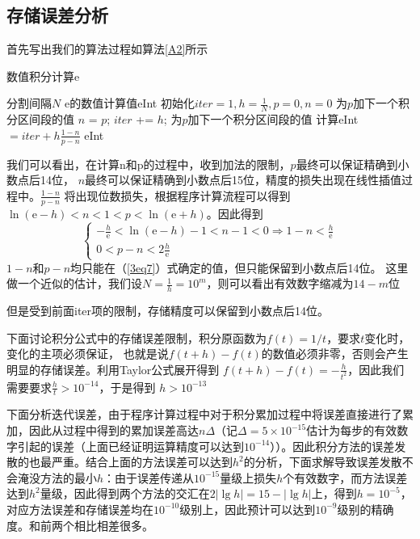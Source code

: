 \documentclass[onecolumn,compsoc]{IEEEtran}
\renewcommand{\|}{\Bigg |}
\newcommand{\e}{\mathrm{e}}
\begin{document}
\subsection{存储误差分析}
首先写出我们的算法过程如算法\ref{A2}所示
\begin{algorithm}[h]\caption{数值积分计算e}\label{A2}
\begin{algorithmic}
\Require 分割间隔$N$
\Ensure e的数值计算值eInt
\State 初始化$iter = 1, h = \frac{1}{N}, p = 0, n = 0$
\State 为$p$加下一个积分区间段的值
\State $n$ = $p$;
\State $iter$ += $h$;
\State 为$p$加下一个积分区间段的值
\EndWhile
\State 计算eInt$ = iter + h\frac{1 - n}{p - n}$
\State \Return eInt
\end{algorithmic}\end{algorithm}
我们可以看出，在计算n和p的过程中，收到加法的限制，$p$最终可以保证精确到小数点后14位，
$n$最终可以保证精确到小数点后15位，精度的损失出现在线性插值过程中。$\frac{1 - n}{p - n}$
将出现位数损失，根据程序计算流程可以得到$\ln(\e-h) < n < 1 < p < \ln(\e+h)$。因此得到
\begin{equation}\label{3eq7}\begin{cases}
-\frac{h}{\e} < \ln(\e-h) -1 < n -1 < 0 \Rightarrow 1-n < \frac{h}{\e} \\
0 < p-n < 2\frac{h}{\e}
\end{cases}\end{equation}
$1-n$和$p-n$均只能在（\ref{3eq7}）式确定的值，但只能保留到小数点后14位。
这里做一个近似的估计，我们设$N = \frac{1}{h} = 10^m$，则可以看出有效数字缩减为$14 - m$位

但是受到前面iter项的限制，存储精度可以保留到小数点后14位。

下面讨论积分公式中的存储误差限制，积分原函数为$f(t) = 1/t$，要求$t$变化时，变化的主项必须保证，
也就是说$f(t+h) - f(t)$的数值必须非零，否则会产生明显的存储误差。利用Taylor公式展开得到
$f(t+h) - f(t) = -\frac{h}{t^2}$，因此我们需要要求$\frac{h}{t}>10^{-14}$，于是得到
$h > 10^{-13}$

下面分析迭代误差，由于程序计算过程中对于积分累加过程中将误差直接进行了累加，因此从过程中得到的累加误差高达$n\Delta$（记$\Delta =5\times10^{-15}$估计为每步的有效数字引起的误差（上面已经证明运算精度可以达到$10^{-14}$））。因此积分方法的误差发散的也最严重。结合上面的方法误差可以达到$h^2$的分析，下面求解导致误差发散不会淹没方法的最小$h$：由于误差传递从$10^{-15}$量级上损失$h$个有效数字，而方法误差达到$h^2$量级，因此得到两个方法的交汇在$2\|\lg h\| = 15-\|\lg h\|$上，得到$h=10^{-5}$，对应方法误差和存储误差均在$10^{-10}$级别上，因此预计可以达到$10^{-9}$级别的精确度。和前两个相比相差很多。
\end{document}
